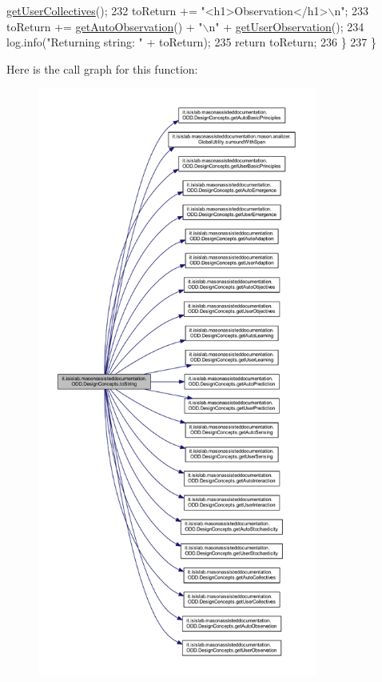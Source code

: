 \begin{DoxyCode}
      \hyperlink{classit_1_1isislab_1_1masonassisteddocumentation_1_1_o_d_d_1_1_design_concepts_a508566b6e3ba02f79c3fc1702575546d}{getUserCollectives}();
232             toReturn += \textcolor{stringliteral}{"<h1>Observation</h1>\(\backslash\)n"};
233             toReturn += \hyperlink{classit_1_1isislab_1_1masonassisteddocumentation_1_1_o_d_d_1_1_design_concepts_ad998a2c1b1bcd74fa4f31452282f9cf0}{getAutoObservation}() + \textcolor{stringliteral}{"\(\backslash\)n"} + 
      \hyperlink{classit_1_1isislab_1_1masonassisteddocumentation_1_1_o_d_d_1_1_design_concepts_a0488c6b3bbfe06fc632aeae338e359bb}{getUserObservation}();
234             log.info(\textcolor{stringliteral}{"Returning string: "} + toReturn);
235             \textcolor{keywordflow}{return} toReturn;
236         \}
237     \}
\end{DoxyCode}


Here is the call graph for this function\-:\nopagebreak
\begin{figure}[H]
\begin{center}
\leavevmode
\includegraphics[height=550pt]{classit_1_1isislab_1_1masonassisteddocumentation_1_1_o_d_d_1_1_design_concepts_ab2ce9b59335e8629f53d9273bc6e7c40_cgraph}
\end{center}
\end{figure}




